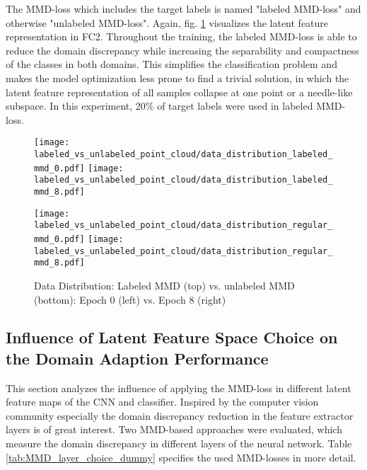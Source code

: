  The MMD-loss which includes the target labels is named "labeled MMD-loss" and otherwise "unlabeled MMD-loss". Again, fig. \ref{fig:point_cloud_labeled_unlabeled_mmd} visualizes the latent feature representation in FC2. Throughout the training, the labeled MMD-loss is able to reduce the domain discrepancy while increasing the separability and compactness of the classes in both domains. This simplifies the classification problem and makes the model optimization less prone to find a trivial solution, in which the latent feature representation of all samples collapse at one point or a needle-like subspace. In this experiment, 20\% of target labels were used in labeled MMD-loss.
\begin{figure}[htp]
  \centering
  \texttt{[image: labeled\_vs\_unlabeled\_point\_cloud/data\_distribution\_labeled\_mmd\_0.pdf]}
  \hspace{.4cm}
  \texttt{[image: labeled\_vs\_unlabeled\_point\_cloud/data\_distribution\_labeled\_mmd\_8.pdf]}

  \vspace{.1cm}

  \texttt{[image: labeled\_vs\_unlabeled\_point\_cloud/data\_distribution\_regular\_mmd\_0.pdf]}
  \hspace{.4cm}
  \texttt{[image: labeled\_vs\_unlabeled\_point\_cloud/data\_distribution\_regular\_mmd\_8.pdf]}
  
  \caption{Data Distribution: Labeled MMD (top) vs. unlabeled MMD (bottom): Epoch 0 (left) vs. Epoch 8 (right)}
  \label{fig:point_cloud_labeled_unlabeled_mmd}
\end{figure}

\subsection{Influence of Latent Feature Space Choice on the Domain Adaption Performance}
\label{cnn_mmd_dummy}

This section analyzes the influence of applying the MMD-loss in different latent feature maps of the CNN and classifier. Inspired by the computer vision community especially the domain discrepancy reduction in the feature extractor layers is of great interest. Two MMD-based approaches were evaluated, which measure the domain discrepancy in different layers of the neural network. Table \ref{tab:MMD_layer_choice_dummy} specifies the used MMD-losses in more detail.


